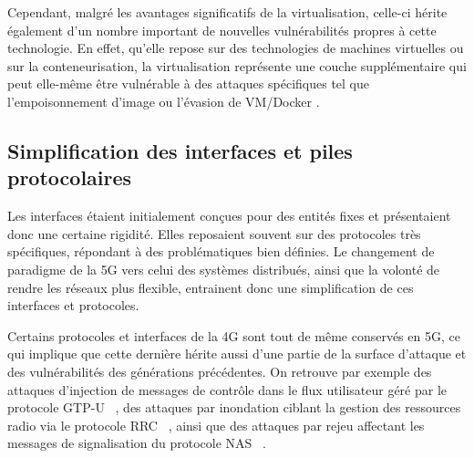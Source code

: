 \documentclass[a4paper,11pt,twoside]{StyleThese}
\begin{document}
Cependant, malgré les avantages significatifs de la virtualisation, celle-ci hérite également d’un nombre important de nouvelles vulnérabilités propres à cette technologie. En effet, qu’elle repose sur des technologies de machines virtuelles ou sur la conteneurisation, la virtualisation représente une couche supplémentaire qui peut elle-même être vulnérable à des attaques spécifiques tel que l'empoisonnement d'image \cite{docker_poisonning} ou l'évasion de VM/Docker \cite{docker_escape}. %


\subsection{Simplification des interfaces et piles protocolaires}
Les interfaces étaient initialement conçues pour des entités fixes et présentaient donc une certaine rigidité. Elles reposaient souvent sur des protocoles très spécifiques, répondant à des problématiques bien définies. Le changement de paradigme de la 5G vers celui des systèmes distribués, ainsi que la volonté de rendre les réseaux plus flexible, entrainent donc une simplification de ces interfaces et protocoles.

Certains protocoles et interfaces de la 4G sont tout de même conservés en 5G, ce qui implique que cette dernière hérite aussi d'une partie de la surface d'attaque et des vulnérabilités des générations précédentes. On retrouve par exemple des attaques d'injection de messages de contrôle dans le flux utilisateur géré par le protocole GTP-U ~\cite{pfcp_in_gtp,spoof_gtp}, des attaques par inondation ciblant la gestion des ressources radio via le protocole RRC ~\cite{ettiane2021toward}, ainsi que des attaques par rejeu affectant les messages de signalisation du protocole NAS ~\cite{salazar2023network}.

\end{document}
